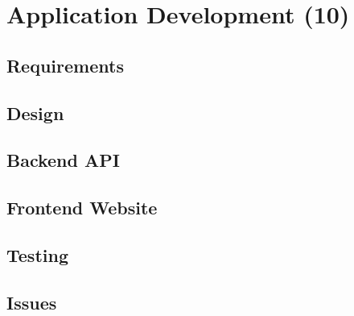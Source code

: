\chapter{Application Development (10)}\label{ch:development}

\section{Requirements}\label{sec:requirements}
\section{Design}\label{sec:design}
\section{Backend API}\label{sec:api}
\section{Frontend Website}\label{sec:website}
\section{Testing}\label{sec:testing}
\section{Issues}\label{sec:issues}
